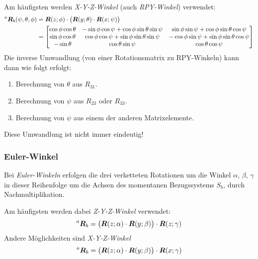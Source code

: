 				Am häufigsten werden \emph{X-Y-Z-Winkel} (auch \emph{RPY-Winkel}) verwendet:
				\begin{align*}
					\prescript{a}{}{\bm{R}}_b(\psi, \theta, \phi) &= \bm{R}(z; \phi) \cdot \big( \bm{R}(y; \theta) \cdot \bm{R}(x; \psi) \big) \\
						&=
							\begin{bmatrix}
								\cos\phi \cos\theta & -\sin\phi \cos\psi + \cos\phi \sin\theta \sin\psi & \sin\phi \sin\psi + \cos\phi \sin\theta \cos\psi  \\
								\sin\phi \cos\theta & \cos\phi \cos\psi + \sin\phi \sin\theta \sin\psi  & -\cos\phi \sin\psi + \sin\phi \sin\theta \cos\psi \\
								-\sin\theta         & \cos\theta \sin\psi                               & \cos\theta \cos\psi
							\end{bmatrix}
				\end{align*}
				Die inverse Umwandlung (von einer Rotationsmatrix zu RPY-Winkeln) kann dann wie folgt erfolgt:
				\begin{enumerate}
					\item Berechnung von \(\theta\) aus \( R_{31} \).
					\item Berechnung von \(\psi\) aus \( R_{23} \) oder \( R_{33} \).
					\item Berechnung von \(\psi\) aus einem der anderen Matrixelemente.
				\end{enumerate}
				Diese Umwandlung ist nicht immer eindeutig!

			\subsubsection{Euler-Winkel}
				Bei \emph{Euler-Winkeln} erfolgen die drei verketteten Rotationen um die Winkel \(\alpha\), \(\beta\), \(\gamma\) in dieser Reihenfolge um die Achsen des momentanen Bezugssystems \(S_b\), \dh durch Nachmultiplikation.

				Am häufigsten werden dabei \emph{Z-Y-Z-Winkel} verwendet:
				\begin{equation*}
					\prescript{a}{}{\bm{R}}_b = \big( \bm{R}(z; \alpha) \cdot \bm{R}(y; \beta) \big) \cdot \bm{R}(z; \gamma)
				\end{equation*}
				Andere Möglichkeiten sind \zB \emph{X-Y-Z-Winkel}
				\begin{equation*}
					\prescript{a}{}{\bm{R}}_b = \big( \bm{R}(z; \alpha) \cdot \bm{R}(y; \beta) \big) \cdot \bm{R}(x; \gamma)
				\end{equation*}

